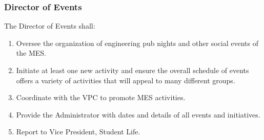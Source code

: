 
\subsubsection{Director of Events}
\label{director-of-events}

The Director of Events shall:

\begin{enumerate}
 \item
  Oversee the organization of engineering pub nights and other social events of the MES. 
 \item
  Initiate at least one new activity and ensure the overall schedule of events offers a variety of activities that will appeal to many different groups.
 \item
  Coordinate with the VPC to promote MES activities.
 \item
  Provide the Administrator with dates and details of all events and initiatives.
 \item
  Report to Vice President, Student Life.
\end{enumerate}